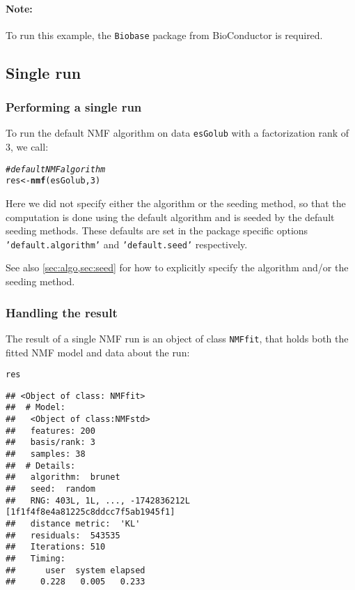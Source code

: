 \documentclass[a4paper]{article}\usepackage[]{graphicx}\usepackage[]{color}
\makeatletter
\newcommand{\hlnum}[1]{\textcolor[rgb]{0.686,0.059,0.569}{#1}}%
\newcommand{\hlcom}[1]{\textcolor[rgb]{0.678,0.584,0.686}{\textit{#1}}}%
\newcommand{\hlstd}[1]{\textcolor[rgb]{0.345,0.345,0.345}{#1}}%
\newcommand{\hlkwb}[1]{\textcolor[rgb]{0.69,0.353,0.396}{#1}}%
\newcommand{\hlkwd}[1]{\textcolor[rgb]{0.737,0.353,0.396}{\textbf{#1}}}%
\newenvironment{kframe}{%
 \def\at@end@of@kframe{}%
 \ifinner\ifhmode%
  \def\at@end@of@kframe{\end{minipage}}%
  \begin{minipage}{\columnwidth}%
 \fi\fi%
 \def\FrameCommand##1{\hskip\@totalleftmargin \hskip-\fboxsep
 \colorbox{shadecolor}{##1}\hskip-\fboxsep
     \hskip-\linewidth \hskip-\@totalleftmargin \hskip\columnwidth}%
 \MakeFramed {\advance\hsize-\width
   \@totalleftmargin\z@ \linewidth\hsize
   \@setminipage}}%
 {\par\unskip\endMakeFramed%
 \at@end@of@kframe}
\newenvironment{knitrout}{}{} %
\let\code=\texttt
\makeatother
\begin{document}
\paragraph{Note:} To run this example, the \code{Biobase} package from BioConductor is required.

\subsection{Single run}\label{sec:single_run}

\subsubsection{Performing a single run}
To run the default NMF algorithm on data \code{esGolub} with a factorization rank of 3, we call: 

\begin{knitrout}
\color{fgcolor}\begin{kframe}
\begin{alltt}
\hlcom{# default NMF algorithm}
\hlstd{res} \hlkwb{<-} \hlkwd{nmf}\hlstd{(esGolub,} \hlnum{3}\hlstd{)}
\end{alltt}
\end{kframe}
\end{knitrout}

Here we did not specify either the algorithm or the seeding method, so that the computation is done using the default algorithm and is seeded by the 
default seeding methods.
These defaults are set in the package specific options \code{'default.algorithm'} 
and \code{'default.seed'} respectively.

See also \cref{sec:algo,sec:seed} for how to explicitly specify the algorithm and/or the seeding method.

\subsubsection{Handling the result}

The result of a single NMF run is an object of class \code{NMFfit}, that holds both the fitted NMF model and data about the run:

\begin{knitrout}
\color{fgcolor}\begin{kframe}
\begin{alltt}
\hlstd{res}
\end{alltt}
\begin{verbatim}
## <Object of class: NMFfit>
##  # Model:
##   <Object of class:NMFstd>
##   features: 200 
##   basis/rank: 3 
##   samples: 38 
##  # Details:
##   algorithm:  brunet 
##   seed:  random 
##   RNG: 403L, 1L, ..., -1742836212L [1f1f4f8e4a81225c8ddcc7f5ab1945f1]
##   distance metric:  'KL' 
##   residuals:  543535 
##   Iterations: 510 
##   Timing:
##      user  system elapsed 
##     0.228   0.005   0.233
\end{verbatim}
\end{kframe}
\end{knitrout}
\end{document}
